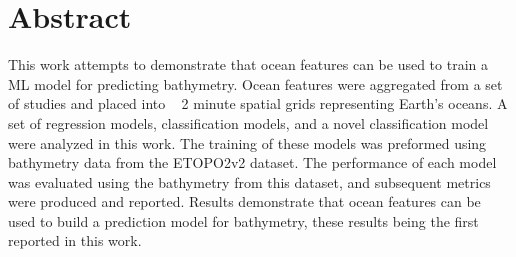 \section{Abstract}
\setlength{\parindent}{10ex}
This work attempts to demonstrate that ocean features can be used to train a \ac{ML} model for predicting bathymetry.
Ocean features were aggregated from a set of studies and placed into ~ 2 minute spatial grids representing Earth's oceans.
A set of regression models, classification models, and a novel classification model were analyzed in this work.
The training of these models was preformed using bathymetry data from the ETOPO2v2 dataset.
The performance of each model was evaluated using the bathymetry from this dataset, and subsequent metrics were produced and reported.
Results demonstrate that ocean features can be used to build a prediction model for bathymetry, these results being the first reported in this work.